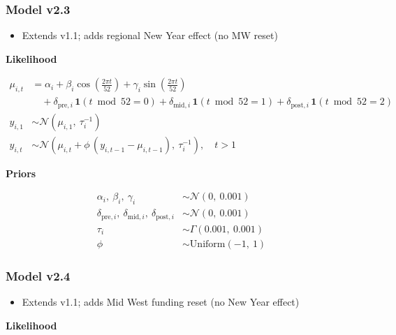 \documentclass[
]{article}
\providecommand{\tightlist}{%
  \setlength{\itemsep}{0pt}\setlength{\parskip}{0pt}}
\begin{document}
\subsubsection*{Model v2.3}\label{model-v2.3}

\begin{itemize}
\tightlist
\item
  Extends v1.1; adds regional New Year effect (no MW reset)
\end{itemize}

\textbf{Likelihood}

\[
\begin{aligned}
\mu_{i,t} &= \alpha_i
              + \beta_i \cos\!\left(\tfrac{2\pi t}{52}\right)
              + \gamma_i \sin\!\left(\tfrac{2\pi t}{52}\right) \\[4pt]
           &\quad + \delta_{\text{pre},i}\,\mathbf{1}(t \bmod 52 = 0)
              + \delta_{\text{mid},i}\,\mathbf{1}(t \bmod 52 = 1)
              + \delta_{\text{post},i}\,\mathbf{1}(t \bmod 52 = 2) \\[4pt]
y_{i,1} &\sim \mathcal{N}(\mu_{i,1},\ \tau_i^{-1}) \\[4pt]
y_{i,t} &\sim \mathcal{N}\!\left(\mu_{i,t} + \phi\,(y_{i,t-1} - \mu_{i,t-1}),\ \tau_i^{-1}\right), \quad t > 1
\end{aligned}
\]

\textbf{Priors}

\[
\begin{aligned}
\alpha_i,\ \beta_i,\ \gamma_i &\sim \mathcal{N}(0,\ 0.001) \\[4pt]
\delta_{\text{pre},i},\ \delta_{\text{mid},i},\ \delta_{\text{post},i} &\sim \mathcal{N}(0,\ 0.001) \\[4pt]
\tau_i &\sim \Gamma(0.001,\ 0.001) \\[4pt]
\phi   &\sim \mathrm{Uniform}(-1,\ 1)
\end{aligned}
\]

\subsubsection*{Model v2.4}\label{model-v2.4}

\begin{itemize}
\tightlist
\item
  Extends v1.1; adds Mid West funding reset (no New Year effect)
\end{itemize}

\textbf{Likelihood}
\end{document}
